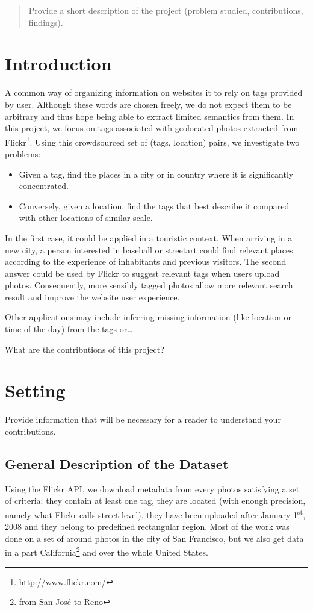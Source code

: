 \begin{abstract}
Provide a short description of the project (problem studied, contributions, findings).
\end{abstract}

\section{Introduction}

A common way of organizing information on websites it to rely on tags provided
by user. Although these words are chosen freely, we do not expect them to be
arbitrary and thus hope being able to extract limited semantics from them. In
this project, we focus on tags associated with geolocated photos extracted
from
Flickr\footnote{\href{https://secure.flickr.com/}{http://www.flickr.com/}}.
Using this crowdsourced set of (tags, location) pairs, we investigate two
problems:
\begin{itemize}
	\item Given a tag, find the places in a city or in country where it is
		significantly concentrated.
	\item Conversely, given a location, find the tags that best describe it
		compared with other locations of similar scale.
\end{itemize}

In the first case, it could be applied in a touristic context. When arriving in a
new city, a person interested in \textsf{baseball} or \textsf{streetart} could
find relevant places according to the experience of inhabitants and previous
visitors. The second answer could be used by Flickr to suggest relevant tags
when users upload photos. Consequently, more sensibly tagged photos allow more
relevant search result and improve the website user experience.

Other applications may include inferring missing information (like location or
time of the day) from the tags or…

What are the contributions of this project?



\section{Setting}
\label{sec:setting}

Provide information that will be necessary for a reader to understand your contributions.

\subsection{General Description of the Dataset}
Using the Flickr API, we download metadata from every photos satisfying a set
of criteria: they contain at least one tag, they are located (with enough
precision, namely what Flickr calls street level), they have been uploaded
after January 1\textsuperscript{st}, 2008 and they belong to predefined
rectangular region. Most of the work was done on a set of around
 photos in the city of San Francisco, but we also get data in
a part California\footnote{from San José to Reno} and over the whole United
States.

